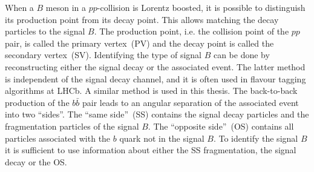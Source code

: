 When a $B$ meson in a $pp$-collision is Lorentz boosted, it is possible to distinguish its production point from its decay point.
This allows matching the decay particles to the signal $B$.
The production point, i.e. the collision point of the $pp$ pair, is called the primary vertex~(PV) and the decay point is called the secondary vertex~(SV).
Identifying the type of signal $B$ can be done by reconstructing either the signal decay or the associated event. 
The latter method is independent of the signal decay channel, and it is often used in flavour tagging algorithms at LHCb. 
A similar method is used in this thesis.
The back-to-back production of the $b\bar{b}$ pair leads to an angular separation of the associated event into two \enquote{sides}.
The \enquote{same side}~(SS) contains the signal decay particles and the fragmentation particles of the signal $B$.
The \enquote{opposite side}~(OS) contains all particles associated with the $b$ quark not in the signal $B$.
To identify the signal $B$ it is sufficient to use information about either the SS fragmentation, the signal decay or the OS.
